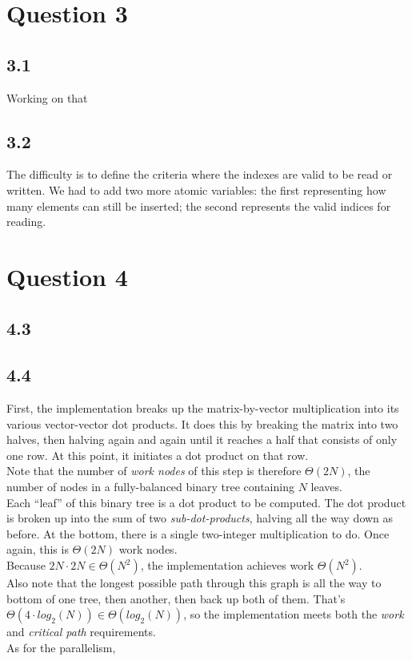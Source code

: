 \documentclass[11pt, letterpaper]{article}
\begin{document}
\section*{Question 3}
\subsection*{3.1}
Working on that
\subsection*{3.2}
The difficulty is to define the criteria where the indexes are valid to be read or written. We had to add two more atomic variables: the first representing how many elements can still be inserted; the second represents the valid indices for reading.

\newpage
\section*{Question 4}

\subsection*{4.3}

\subsection*{4.4}
First, the implementation breaks up the matrix-by-vector multiplication into its various vector-vector dot products. It does this by breaking the matrix into two halves, then halving again and again until it reaches a half that consists of only one row. At this point, it initiates a dot product on that row.\\

Note that the number of \textit{work nodes} of this step is therefore $\Theta(2N)$, the number of nodes in a fully-balanced binary tree containing $N$ leaves.\\

Each ``leaf'' of this binary tree is a dot product to be computed. The dot product is broken up into the sum of two \textit{sub-dot-products}, halving all the way down as before. At the bottom, there is a single two-integer multiplication to do. Once again, this is $\Theta(2N)$ work nodes.\\

Because $2N \cdot 2N \in \Theta(N^2)$, the implementation achieves work $\Theta(N^2)$.\\

Also note that the longest possible path through this graph is all the way to bottom of one tree, then another, then back up both of them. That's $\Theta(4 \cdot log_2(N)) \in \Theta(log_2(N))$, so the implementation meets both the \textit{work} and \textit{critical path} requirements.\\

As for the parallelism,
\end{document}
